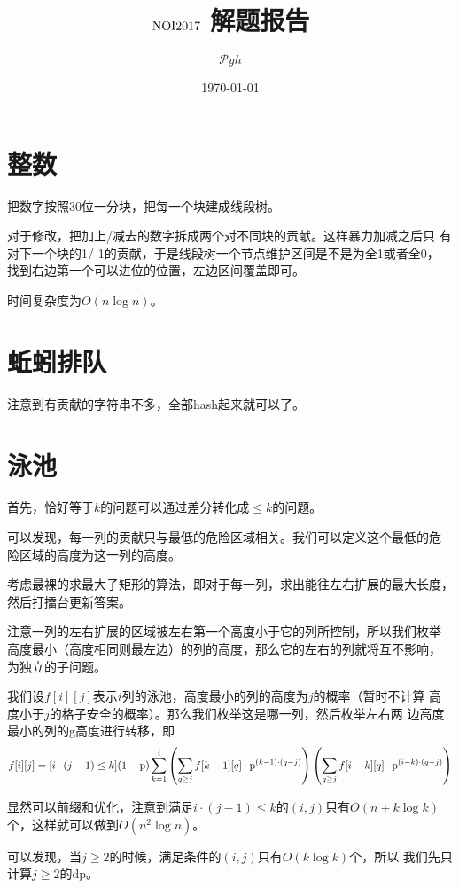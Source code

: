 \documentclass[a4paper]{article}
\date{\today}
\title{$\rm NOI2017$ 解题报告}
\author{$\mathcal Pyh$}
\newcommand{\kai}{\CJKfamily{kai}}
\begin{document}
\maketitle

\kai

\section{整数}

把数字按照30位一分块，把每一个块建成线段树。

对于修改，把加上/减去的数字拆成两个对不同块的贡献。这样暴力加减之后只
有对下一个块的1/-1的贡献，于是线段树一个节点维护区间是不是为全1或者全0，
找到右边第一个可以进位的位置，左边区间覆盖即可。

时间复杂度为$O(n\log n)$。

\section{蚯蚓排队}

注意到有贡献的字符串不多，全部hash起来就可以了。

\section{泳池}

首先，恰好等于$k$的问题可以通过差分转化成$\leq k$的问题。

可以发现，每一列的贡献只与最低的危险区域相关。我们可以定义这个最低的危
险区域的高度为这一列的高度。

考虑最裸的求最大子矩形的算法，即对于每一列，求出能往左右扩展的最大长度，
然后打擂台更新答案。

注意一列的左右扩展的区域被左右第一个高度小于它的列所控制，所以我们枚举
高度最小（高度相同则最左边）的列的高度，那么它的左右的列就将互不影响，
为独立的子问题。

我们设$f[i][j]$表示$i$列的泳池，高度最小的列的高度为$j$的概率（暂时不计算
高度小于$j$的格子安全的概率）。那么我们枚举这是哪一列，然后枚举左右两
边高度最小的列的g高度进行转移，即$$f[i][j]=[i\cdot (j-1)\leq k](1-{\rm p})\sum_{k=1}^i\left(\sum_{q\geq
  j}f[k-1][q]\cdot {\rm p}^{(k-1)\cdot (q-j)}\right)\left(\sum_{q\geq
  j}f[i-k][q]\cdot {\rm p}^{(i-k)\cdot (q-j)}\right)$$

显然可以前缀和优化，注意到满足$i\cdot (j-1)\leq k$的$(i,j)$只有$O(n+k\log
k)$个，这样就可以做到$O(n^2\log n)$。

可以发现，当$j\geq 2$的时候，满足条件的$(i,j)$只有$O(k\log k)$个，所以
我们先只计算$j\geq 2$的dp。
\end{document}
